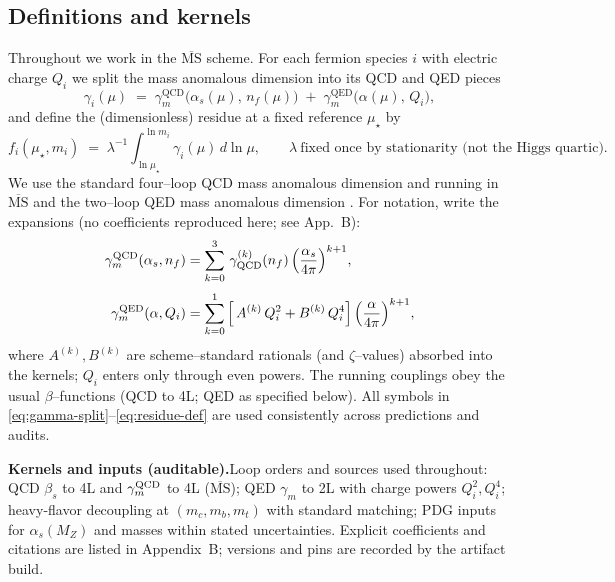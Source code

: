 \documentclass[epjc3]{svjour3}
\begin{document}
\subsection{Definitions and kernels}
\label{sec:defs-kernels}
Throughout we work in the $\overline{\mathrm{MS}}$ scheme. For each fermion species $i$ with electric charge $Q_i$ we split the mass anomalous dimension into its QCD and QED pieces
\begin{equation}
  \gamma_i(\mu)\;=\;\gamma^{\mathrm{QCD}}_m\!\bigl(\alpha_s(\mu),\,n_f(\mu)\bigr)\;+\;\gamma^{\mathrm{QED}}_m\!\bigl(\alpha(\mu),\,Q_i\bigr),
  \label{eq:gamma-split}
\end{equation}
and define the (dimensionless) residue at a fixed reference $\mu_\star$ by
\begin{equation}
  f_i(\mu_\star,m_i)\;=\;\lambda^{-1}\!\int_{\ln\mu_\star}^{\ln m_i}\gamma_i(\mu)\,d\ln\mu,
  \qquad \lambda\ \text{fixed once by stationarity (not the Higgs quartic).}
  \label{eq:residue-def}
\end{equation}
We use the standard four–loop QCD mass anomalous dimension and running in $\overline{\mathrm{MS}}$ and the two–loop QED mass anomalous dimension \cite{VermaserenLarinRitbergen97,vanRitbergenVermaserenLarin97,MachacekVaughn83,LuoWangXiao2003,PDG2023}. For notation, write the expansions (no coefficients reproduced here; see App.~B):
\begin{align}
  \gamma^{\mathrm{QCD}}_m(\alpha_s,n_f)
  &=\sum_{k=0}^{3}\,\gamma^{(k)}_{\mathrm{QCD}}(n_f)\,
    \Bigl(\frac{\alpha_s}{4\pi}\Bigr)^{k+1},\\[3pt]
  \gamma^{\mathrm{QED}}_m(\alpha,Q_i)
  &=\sum_{k=0}^{1}\,\Bigl[\,A^{(k)}\,Q_i^{2}+B^{(k)}\,Q_i^{4}\Bigr]\,
    \Bigl(\frac{\alpha}{4\pi}\Bigr)^{k+1},
\end{align}
where $A^{(k)},B^{(k)}$ are scheme–standard rationals (and $\zeta$–values) absorbed into the kernels; $Q_i$ enters only through even powers. The running couplings obey the usual $\beta$–functions (QCD to 4L; QED as specified below).  All symbols in \eqref{eq:gamma-split}–\eqref{eq:residue-def} are used consistently across predictions and audits.

\medskip
\noindent\textbf{Kernels and inputs (auditable).}\;Loop orders and sources used throughout: QCD $\beta_s$ to 4L and $\gamma_m^{\rm QCD}$ to 4L ($\overline{\mathrm{MS}}$); QED $\gamma_m$ to 2L with charge powers $Q_i^2,Q_i^4$; heavy-flavor decoupling at $(m_c,m_b,m_t)$ with standard matching; PDG inputs for $\alpha_s(M_Z)$ and masses within stated uncertainties. Explicit coefficients and citations are listed in Appendix~B; versions and pins are recorded by the artifact build.
\end{document}
